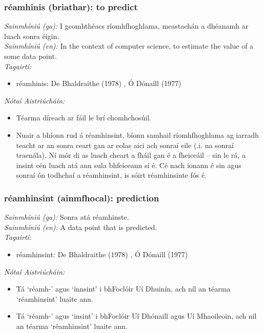 \subsubsection*{réamhinis (briathar): to predict}
 \noindent \textit{Sainmhíniú (ga):} I gcomhthéacs ríomhfhoghlama, meastachán a dhéanamh ar luach sonra éigin.
\\
 \noindent \textit{Sainmhíniú (en):} In the context of computer science, to estimate the value of a some data point.
\\
 \noindent \textit{Tagairtí:}
\begin{itemize}
	\item réamhinis: De Bhaldraithe (1978) \cite{de-bhaldraithe}, Ó Dónaill (1977) \cite{odonaill}
\end{itemize}

 \noindent \textit{Nótaí Aistriúcháin:}
\begin{itemize}
	\item Téarma díreach ar fáil le brí chomhchosúil.
	\item Nuair a bhíonn rud á réamhinsint, bíonn samhail ríomhfhoghlama ag iarradh teacht ar an sonra ceart gan ar eolas aici ach sonraí eile (.i. na sonraí traenála). Ní mór di as luach cheart a fháil gan é a fheiceáil -- sin le rá, a insint cén luach atá ann sula bhfeiceann sí é. Cé nach ionann é sin agus sonraí ón todhchaí a réamhinsint, is sóirt réamhinsinte fós é.
\end{itemize}


\subsubsection*{réamhinsint (ainmfhocal): prediction}
 \noindent \textit{Sainmhíniú (ga):} Sonra atá réamhinste.
\\
 \noindent \textit{Sainmhíniú (en):} A data point that is predicted.
\\
 \noindent \textit{Tagairtí:}
\begin{itemize}
	\item réamhinsint: De Bhaldraithe (1978) \cite{de-bhaldraithe}, Ó Dónaill (1977) \cite{odonaill}
\end{itemize}

 \noindent \textit{Nótaí Aistriúcháin:}
\begin{itemize}
	\item Tá `réamh-' agus `innsint' i bhFoclóir Uí Dhuinín, ach níl an téarma `réamhinsint' luaite ann.
	\item Tá `réamh-' agus `insint' i bhFoclóir Uí Dhónaill agus Uí Mhaoileoin, ach níl an téarma `réamhinsint' luaite ann.
\end{itemize}


